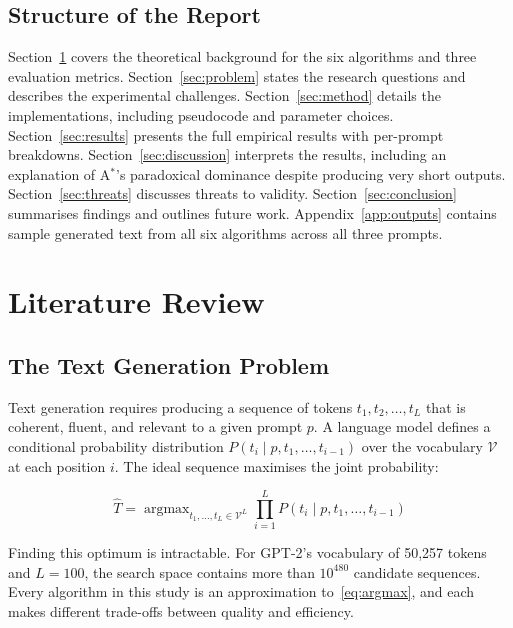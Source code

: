 \documentclass[12pt]{article}
\begin{document}
	\subsection{Structure of the Report}
	
	Section~\ref{sec:litreview} covers the theoretical background for the six algorithms and three evaluation metrics. Section~\ref{sec:problem} states the research questions and describes the experimental challenges. Section~\ref{sec:method} details the implementations, including pseudocode and parameter choices. Section~\ref{sec:results} presents the full empirical results with per-prompt breakdowns. Section~\ref{sec:discussion} interprets the results, including an explanation of A$^*$'s paradoxical dominance despite producing very short outputs. Section~\ref{sec:threats} discusses threats to validity. Section~\ref{sec:conclusion} summarises findings and outlines future work. Appendix~\ref{app:outputs} contains sample generated text from all six algorithms across all three prompts.
	
	\section{Literature Review}
	\label{sec:litreview}
	
	\subsection{The Text Generation Problem}
	
	Text generation requires producing a sequence of tokens $t_1, t_2, \ldots, t_L$ that is coherent, fluent, and relevant to a given prompt $p$. A language model defines a conditional probability distribution $P(t_i \mid p, t_1, \ldots, t_{i-1})$ over the vocabulary $\mathcal{V}$ at each position $i$. The ideal sequence maximises the joint probability:
	
	\begin{equation}
		\hat{T} = \operatorname{argmax}_{t_1,\ldots,t_L \in \mathcal{V}^L}
		\prod_{i=1}^{L} P(t_i \mid p, t_1, \ldots, t_{i-1})
		\label{eq:argmax}
	\end{equation}
	
	Finding this optimum is intractable. For GPT-2's vocabulary of 50,257 tokens and $L=100$, the search space contains more than $10^{480}$ candidate sequences. Every algorithm in this study is an approximation to~\eqref{eq:argmax}, and each makes different trade-offs between quality and efficiency.
	
\end{document}
